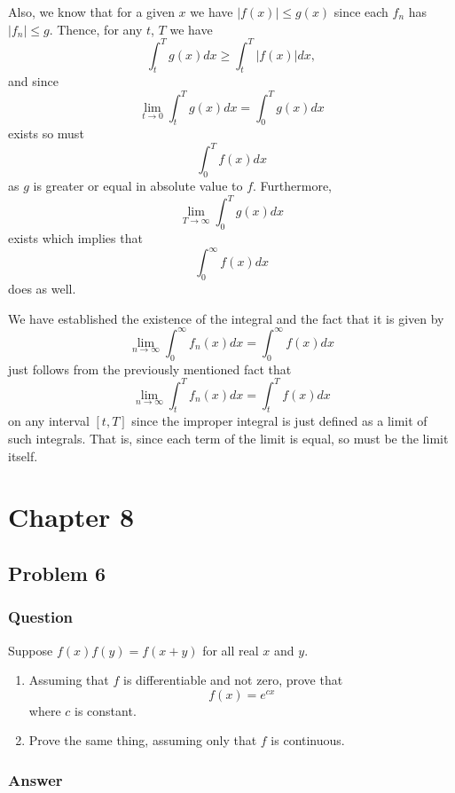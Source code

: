 \documentclass[12pt]{article}
\begin{document}
Also, we know that for a given $x$ we have $|f(x)|\leq g(x)$ since each $f_n$ has $|f_n|\leq g$.  Thence, for any $t$, $T$ we have 
\[  \int_t^T g(x) dx \geq \int_t^T |f(x)| dx,\]
and since 
\[\lim_{t\to 0} \int_t^T g(x) dx  = \int_0^T g(x) dx\]
exists so must 
\[\int_0^T f(x) dx\]
as $g$ is greater or equal in absolute value to $f$.
Furthermore,
\[\lim_{T\to \infty} \int_0^T g(x) dx\]
exists which implies that 
\[\int_0^\infty f(x) dx\]
does as well.

We have established the existence of the integral and the fact that it is given by 
\[ \lim_{n \to \infty} \int_0^\infty f_n(x) dx = \int_0^\infty f(x) dx\]
just follows from the previously mentioned fact that 
\[ \lim_{n \to \infty} \int_t^T f_n(x) dx = \int_t^T f(x) dx\]
on any interval $[t,T]$ since the improper integral is just defined as a limit of such integrals. That is, since each term of the limit is equal, so must be the limit itself.

\section{Chapter 8}
\subsection{Problem 6}

\subsubsection{Question}
Suppose $f(x) f(y) = f(x+y)$ for all real $x$ and $y$.
\begin{enumerate}
\item Assuming that $f$ is differentiable and not zero, prove that
\[ f(x) = e^{c x}\]
where $c$ is constant.
\item Prove the same thing, assuming only that $f$ is continuous. 
\end{enumerate}
\subsubsection{Answer}
\end{document}
